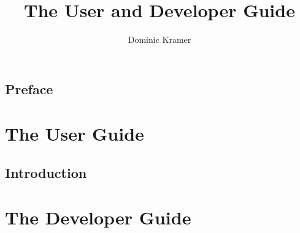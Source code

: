 \documentclass[letterpaper,11pt]{book}
\title{The \notelab User and Developer Guide}
\author{Dominic Kramer}
\begin{document}
  \frontmatter
  
  \maketitle
  
  \chapter*{Preface}
  
  
  \tableofcontents
  
  \mainmatter
  
  \part{The User Guide}
    \chapter{Introduction}
      
  \part{The Developer Guide}
  
  \appendix
  \backmatter
  
\end{document}

